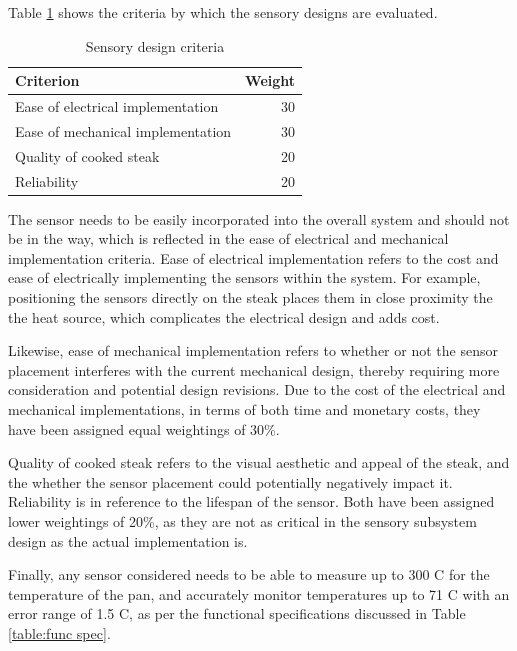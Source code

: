 \documentclass[11pt]{article}
\begin{document}
Table \ref{table:sensory criteria} shows the criteria by which the sensory designs are evaluated.

\begin{table}[H]
\begin{tabularx}{\textwidth}{X  r}

\hline

Criterion & Weight \\

\hline

Ease of electrical implementation & 30 \\
Ease of mechanical implementation & 30 \\
Quality of cooked steak & 20 \\
Reliability & 20 \\

\hline

\end{tabularx}
\caption{Sensory design criteria}
\label{table:sensory criteria}
\end{table}

The sensor needs to be easily incorporated into the overall system and should not be in the way, which is reflected in the ease of electrical and mechanical implementation criteria.
Ease of electrical implementation refers to the cost and ease of electrically implementing the sensors within the system.
For example, positioning the sensors directly on the steak places them in close proximity the the heat source, which complicates the electrical design and adds cost.

Likewise, ease of mechanical implementation refers to whether or not the sensor placement interferes with the current mechanical design, thereby requiring more consideration and potential design revisions.
Due to the cost of the electrical and mechanical implementations, in terms of both time and monetary costs, they have been assigned equal weightings of 30\%.

Quality of cooked steak refers to the visual aesthetic and appeal of the steak, and the whether the sensor placement could potentially negatively impact it.
Reliability is in reference to the lifespan of the sensor.
Both have been assigned lower weightings of 20\%, as they are not as critical in the sensory subsystem design as the actual implementation is. 

Finally, any sensor considered needs to be able to measure up to 300 \degree C for the temperature of the pan, and accurately monitor temperatures up to 71 \degree C with an error range of 1.5 \degree C, as per the functional specifications discussed in Table \ref{table:func spec}. 
\end{document}
